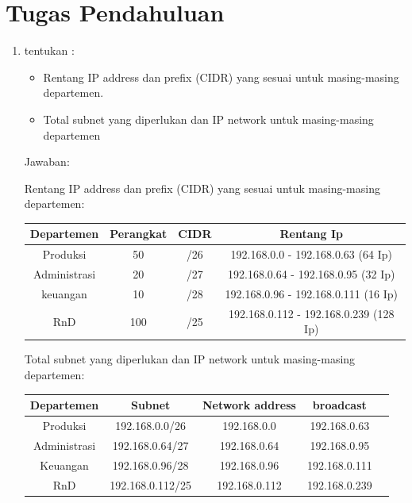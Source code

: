 \section{Tugas Pendahuluan}
\begin{enumerate}
	\item tentukan :
    \begin{itemize}
        \item Rentang IP address dan prefix (CIDR) yang sesuai untuk masing-masing departemen.
        \item Total subnet yang diperlukan dan IP network untuk masing-masing departemen 
    \end{itemize}
    Jawaban:

    Rentang IP address dan prefix (CIDR) yang sesuai untuk masing-masing departemen:
\begin{center}
\begin{tabular}{ |c|c|c|c| } 
\hline
Departemen & Perangkat & CIDR & Rentang Ip\\
\hline
Produksi & 50 & /26 & 192.168.0.0 - 192.168.0.63 (64 Ip)\\
Administrasi & 20 & /27 & 192.168.0.64 - 192.168.0.95 (32 Ip)\\
keuangan & 10  & /28 & 192.168.0.96 - 192.168.0.111 (16 Ip)\\
RnD & 100  & /25 & 192.168.0.112 - 192.168.0.239 (128 Ip)\\
\hline
\end{tabular}
\end{center}

  Total subnet yang diperlukan dan IP network untuk masing-masing departemen:
\begin{center}
\begin{tabular}{ |c|c|c|c|c| } 
\hline
Departemen & Subnet & Network address & broadcast\\
\hline
Produksi & 192.168.0.0/26 & 192.168.0.0 & 192.168.0.63  \\
Administrasi & 192.168.0.64/27 & 192.168.0.64 & 192.168.0.95 \\
Keuangan & 192.168.0.96/28 & 192.168.0.96 & 192.168.0.111 \\
RnD & 192.168.0.112/25 & 192.168.0.112 & 192.168.0.239 \\
\hline
\end{tabular}
\end{center}


\end{enumerate}
